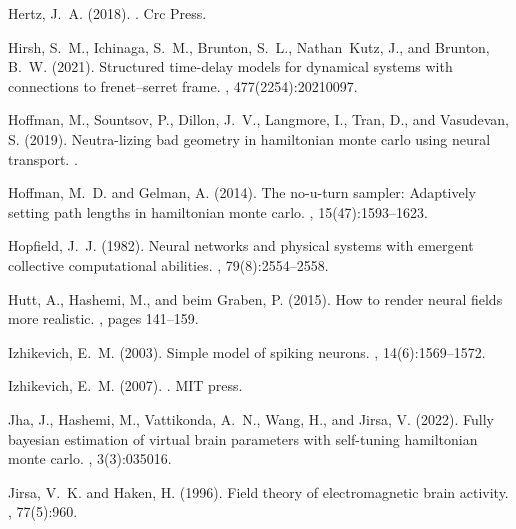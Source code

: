\documentclass[12pt]{article}
\begin{document}
\begin{thebibliography}{}
Hertz, J.~A. (2018).
.
\newblock Crc Press.

Hirsh, S.~M., Ichinaga, S.~M., Brunton, S.~L., Nathan~Kutz, J., and Brunton,
  B.~W. (2021).
\newblock Structured time-delay models for dynamical systems with connections
  to frenet--serret frame.
, 477(2254):20210097.

Hoffman, M., Sountsov, P., Dillon, J.~V., Langmore, I., Tran, D., and
  Vasudevan, S. (2019).
\newblock Neutra-lizing bad geometry in hamiltonian monte carlo using neural
  transport.
.

Hoffman, M.~D. and Gelman, A. (2014).
\newblock The no-u-turn sampler: Adaptively setting path lengths in hamiltonian
  monte carlo.
, 15(47):1593--1623.

Hopfield, J.~J. (1982).
\newblock Neural networks and physical systems with emergent collective
  computational abilities.
,
  79(8):2554--2558.

Hutt, A., Hashemi, M., and beim Graben, P. (2015).
\newblock How to render neural fields more realistic.
, pages 141--159.

Izhikevich, E.~M. (2003).
\newblock Simple model of spiking neurons.
, 14(6):1569--1572.

Izhikevich, E.~M. (2007).
.
\newblock MIT press.

Jha, J., Hashemi, M., Vattikonda, A.~N., Wang, H., and Jirsa, V. (2022).
\newblock Fully bayesian estimation of virtual brain parameters with
  self-tuning hamiltonian monte carlo.
, 3(3):035016.

Jirsa, V.~K. and Haken, H. (1996).
\newblock Field theory of electromagnetic brain activity.
, 77(5):960.


\end{thebibliography}
\end{document}

